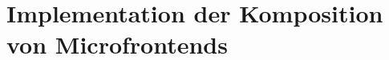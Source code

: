 
\graphicspath{{./sections/methology/assets}}
\chapter{Implementation der Komposition von Microfrontends}




